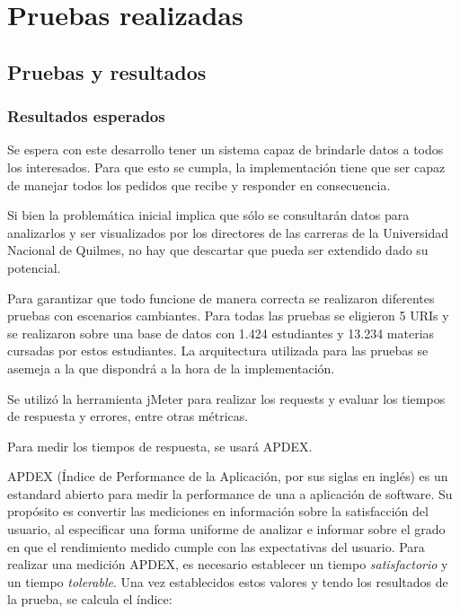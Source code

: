 \chapter{Pruebas realizadas}
\label{sec:implementacion}

\section[Pruebas y resultados]{Pruebas y resultados}

\subsection[Resultados esperados]{Resultados esperados}

Se espera con este desarrollo tener un sistema capaz de brindarle datos a todos los interesados. Para que esto se cumpla, la implementación tiene que ser capaz de manejar todos los pedidos que recibe y responder en consecuencia. 

Si bien la problemática inicial implica que sólo se consultarán datos para analizarlos y ser visualizados por los directores de las carreras de la Universidad Nacional de Quilmes, no hay que descartar que pueda ser extendido dado su potencial.

Para garantizar que todo funcione de manera correcta se realizaron diferentes pruebas con escenarios cambiantes.
Para todas las pruebas se eligieron 5 URIs y se realizaron sobre una base de datos con 1.424 estudiantes y 13.234 materias cursadas por estos estudiantes.
La arquitectura utilizada para las pruebas se asemeja a la que dispondrá a la hora de la implementación.

Se utilizó la herramienta jMeter para realizar los requests y evaluar los tiempos de respuesta y errores, entre otras métricas.

Para medir los tiempos de respuesta, se usará APDEX.

APDEX (Índice de Performance de la Aplicación, por sus siglas en inglés) es un estandard abierto para medir la performance de una a aplicación de software. Su propósito es convertir las mediciones en información sobre la satisfacción del usuario, al especificar una forma uniforme de analizar e informar sobre el grado en que el rendimiento medido cumple con las expectativas del usuario.
Para realizar una medición APDEX, es necesario establecer un tiempo \emph{satisfactorio} y un tiempo \emph{tolerable}.
Una vez establecidos estos valores y tendo los resultados de la prueba, se calcula el índice:

